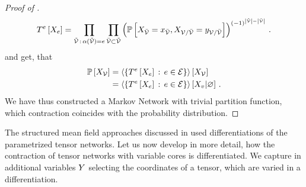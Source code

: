 \begin{proof}[Proof of ]
\begin{align*}
        T^{e}\left[X_{e}\right] = \prod_{\tilde{\mathcal{V}} \, : \, \alpha(\tilde{\mathcal{V}}) = e} \prod_{\bar{\mathcal{V}}\subset\tilde{\mathcal{V}}}
        \left(
        \mathbb{P}\left[X_{\bar{\mathcal{V}}}=x_{\bar{\mathcal{V}}},X_{\mathcal{V}/\bar{\mathcal{V}}}=y_{\mathcal{V}/\bar{\mathcal{V}}}\right]
        \right)^{(-1)^{\left|\tilde{\mathcal{V}}\right|-\left|\bar{\mathcal{V}}\right|}} \, .
    \end{align*}
    and get, that
    \begin{align*}
        \mathbb{P}\left[X_{\mathcal{V}}\right] & = \left\langle \left\{T^{e}\left[X_{e}\right]\, : \, e\in\mathcal{E}\right\}\right\rangle \left[ X_{\mathcal{V}} \right] \\
        & = \left\langle \left\{T^{e}\left[X_{e}\right]\, : \, e\in\mathcal{E}\right\}\right\rangle \left[ X_{v} | \varnothing \right] \, .
    \end{align*}
    We have thus constructed a Markov Network with trivial partition function, which contraction coincides with the probability distribution.
\end{proof}


The structured mean field approaches discussed in  used differentiations of the parametrized tensor networks.
Let us now develop in more detail, how the contraction of tensor networks with variable cores is differentiated.
We capture in additional variables $Y$ selecting the coordinates of a tensor, which are varied in a differentiation.

